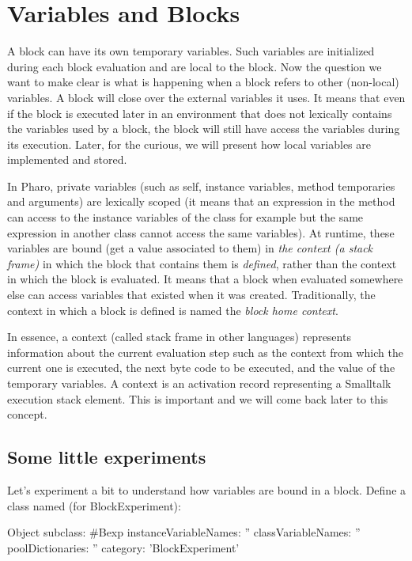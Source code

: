 \documentclass[a4paper,10pt,twoside]{book}
\begin{document}
\section{Variables and Blocks}
A block can have its own temporary variables. Such variables are initialized during each block evaluation and are local to the block. Now the question we want to make clear is what is happening when a block refers to other (non-local) variables. A block will close over the external variables it uses. It means that even if the block is executed later in an environment that does not lexically contains the variables used by a block, the block will still have access the variables during its execution. Later, for the curious, we will present how local variables are implemented and stored.

In Pharo, private variables (such as self, instance variables, method temporaries and arguments) are lexically scoped (it means that an expression in the method can access to the instance variables of the class for example but the same expression in another class cannot access the same variables). At runtime, these variables are bound (get a value associated to them) in \emph{the context (a stack frame)} in which the block that contains them is \emph{defined}, rather than the context in which the block is evaluated. It means that a block when evaluated somewhere else can access variables that existed when it was created. Traditionally, the context in which a block is defined is named the \emph{block home context}.

In essence, a context (called stack frame in other languages) represents information about the current evaluation step such as the context from which the current one is executed, the next byte code to be executed, and the value of the temporary variables. A context is an activation record representing a Smalltalk execution stack element. This is important and we will come back later to this concept.

\subsection{Some little experiments}
Let's experiment a bit to understand how variables are bound in a block. Define a class named  (for BlockExperiment):

\begin{code}{}
Object subclass: #Bexp
	instanceVariableNames: ''
	classVariableNames: ''
	poolDictionaries: ''
	category: 'BlockExperiment'
\end{code}
\end{document}
